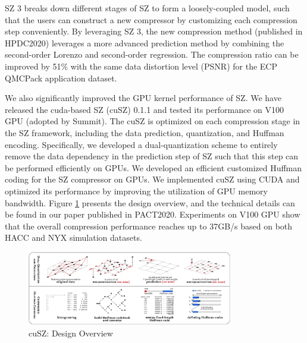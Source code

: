 SZ 3 breaks down different stages of SZ to form a loosely-coupled model, such that the users can construct a new compressor by customizing each compression step conveniently. By leveraging SZ 3, the new compression method (published in HPDC2020) leverages a more advanced prediction method by combining the second-order Lorenzo and second-order regression. %
The compression ratio can be improved by 51\% with the same data distortion level (PSNR) for the ECP QMCPack application dataset.  


We also significantly improved the GPU kernel performance of SZ. We have released the cuda-based SZ (cuSZ) 0.1.1 and tested its performance on V100 GPU (adopted by Summit). The cuSZ is optimized on each compression stage in the SZ framework, including the data prediction, quantization, and Huffman encoding. Specifically, we developed a dual-quantization scheme to entirely remove the data dependency in the prediction step of SZ such that this step can be performed efficiently on GPUs. We developed an efficient customized Huffman coding for the SZ compressor on GPUs. We implemented cuSZ using CUDA and optimized its performance by improving the utilization of GPU memory bandwidth. Figure \ref{fig:cuSZ:arch} presents the design overview, and the technical details can be found in our paper published in PACT2020. Experiments on V100 GPU show that the overall compression performance reaches up to 37GB/s based on both HACC and NYX simulation datasets.

\begin{figure}
  \centering
  \includegraphics[width=0.8\textwidth]{projects/2.3.4-DataViz/2.3.4.14-VeloC-SZ/200718_workflow.pdf}
  \caption{cuSZ: Design Overview}%
  \label{fig:cuSZ:arch}%
  \vspace{-2mm}
\end{figure}

